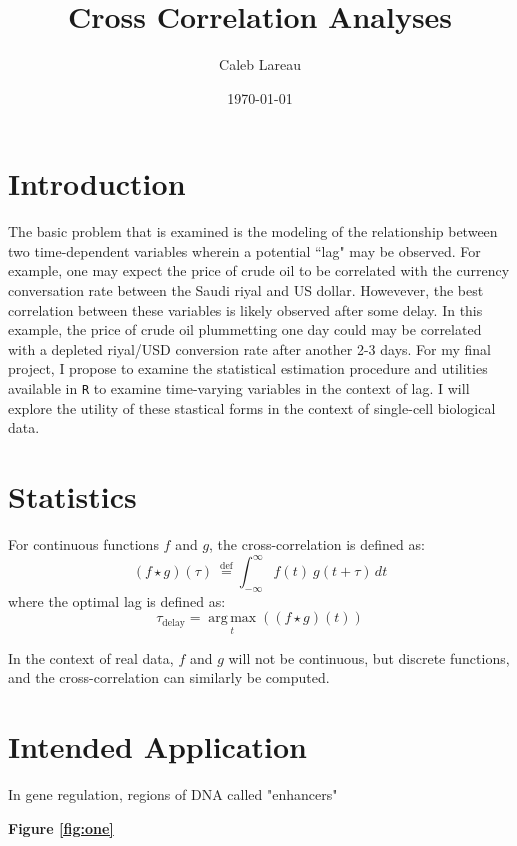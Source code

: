 \documentclass{article}\usepackage[]{graphicx}\usepackage[]{color}
\title{Cross Correlation Analyses}
\author{Caleb Lareau}
\date{\today}
\begin{document}
\maketitle

\section*{Introduction}
The basic problem that is examined is the modeling of the relationship between two time-dependent variables wherein a potential ``lag" may be observed. For example, one may expect the price of crude oil to be correlated with the currency conversation rate between the Saudi riyal and US dollar. Howevever, the best correlation between these variables is likely observed after some delay. In this example, the price of crude oil plummetting one day could may be correlated with a depleted riyal/USD conversion rate after another 2-3 days. For my final project, I propose to examine the statistical estimation procedure and utilities available in \texttt{R} to examine time-varying variables in the context of lag. I will explore the utility of these stastical forms in the context of single-cell biological data. 

\section*{Statistics}
For continuous functions $f$ and $g$, the cross-correlation is defined as:
$$(f\star g)(\tau )\ {\stackrel {\mathrm {def} }{=}}\int _{-\infty }^{\infty }f(t)\ g(t+\tau )\,dt$$
where the optimal lag is defined as:
$$ \tau _{\mathrm {delay} }={\underset {t}{\operatorname {arg\,max} }}((f\star g)(t))$$

\noindent In the context of real data, $f$ and $g$ will not be continuous, but discrete functions, and the cross-correlation can similarly be computed.

\section*{Intended Application}
In gene regulation, regions of DNA called "enhancers" 

 \textbf{Figure \ref{fig:one}}
 
\end{document}

